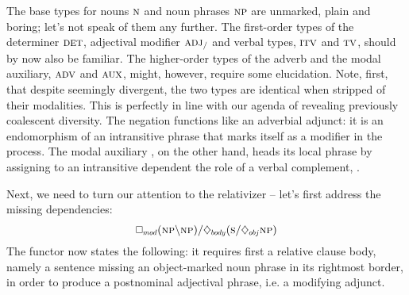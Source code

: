 The base types for nouns $\n[s]$ and noun phrases $\np[s]$ are unmarked, plain and boring; let's not speak of them any further.
The first-order types of the determiner $\textsc{\normalfont\textsc{det}}$, adjectival modifier $\textsc{\normalfont\textsc{adj}}_{/}$ and verbal types, $\textsc{\normalfont\textsc{itv}}$ and $\textsc{\normalfont\textsc{tv}}$, should by now also be familiar.
The higher-order types of the adverb and the modal auxiliary, $\textsc{\normalfont\textsc{adv}}$ and $\textsc{\normalfont\textsc{aux}}$, might, however, require some elucidation.
Note, first, that despite seemingly divergent, the two types are identical when stripped of their modalities.
This is perfectly in line with our agenda of revealing previously coalescent diversity.
The negation  functions like an adverbial adjunct: it is an endomorphism of an intransitive phrase that marks itself as a modifier in the process.
The modal auxiliary , on the other hand, heads its local phrase by assigning to an intransitive dependent the role of a verbal complement, .

Next, we need to turn our attention to the relativizer -- let's first address the missing dependencies:
\begin{equation}
\dbox{mod}(\np\divleft\np)\divright\ddia{body}(\s\divright\ddia{obj}\np)\label{equation:deprel}
\end{equation}
The functor now states the following: it requires first a relative clause body, namely a sentence missing an object-marked noun phrase in its rightmost border, in order to produce a postnominal adjectival phrase, i.e. a modifying adjunct.

